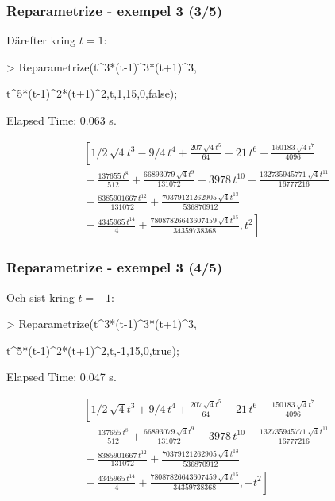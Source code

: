 \documentclass{beamer}
\begin{document}
\begin{frame}
	\frametitle{Reparametrize - exempel 3 (3/5)}
	
	\begin{example}
		Därefter kring $t=1$:
		
		\begin{semiverbatim}
			> Reparametrize(t\^{}3*(t-1)\^{}3*(t+1)\^{}3,
			
			\qquad t\^{}5*(t-1)\^{}2*(t+1)\^{}2,t,1,15,0,false);
			
			
			Elapsed Time: 0.063 s.
		\end{semiverbatim}
		
		\[\begin{array}{l}
		\left[1/2\, \sqrt{4}{t}^{3}-9/4\,{t}^{4}+{\frac {207\, \sqrt{4}{t}^{5}}{64}}-21\,{t}^{6}+{\frac {150183\, \sqrt{4}{t}^{7}}{4096}}\right. \\
		\mbox{}-{\frac {137655\,{t}^{8}}{512}}+{\frac {66893079\, \sqrt{4}{t}^{9}}{131072}}-3978\,{t}^{10}+{\frac {132735945771\, \sqrt{4}{t}^{11}}{16777216}}\\
		\mbox{}-{\frac {8385901667\,{t}^{12}}{131072}}+{\frac {70379121262905\, \sqrt{4}{t}^{13}}{536870912}}\\
		\left.\mbox{}-{\frac {4345965\,{t}^{14}}{4}}+{\frac {78087826643607459\, \sqrt{4}{t}^{15}}{34359738368}},{t}^{2}\right]
		\end{array}\]
	\end{example}
\end{frame}

\begin{frame}
	\frametitle{Reparametrize - exempel 3 (4/5)}
	
	\begin{example}
		Och sist kring $t=-1$:
		
		\begin{semiverbatim}
			> Reparametrize(t\^{}3*(t-1)\^{}3*(t+1)\^{}3,
			
			\qquad t\^{}5*(t-1)\^{}2*(t+1)\^{}2,t,-1,15,0,true);
			
			
			Elapsed Time: 0.047 s.
		\end{semiverbatim}
		
		\[\begin{array}{l}
		\left[1/2\, \sqrt{4}{t}^{3}+9/4\,{t}^{4}+{\frac {207\, \sqrt{4}{t}^{5}}{64}}+21\,{t}^{6}+{\frac {150183\, \sqrt{4}{t}^{7}}{4096}}\right.\\
		\mbox{}+{\frac {137655\,{t}^{8}}{512}}+{\frac {66893079\, \sqrt{4}{t}^{9}}{131072}}+3978\,{t}^{10}+{\frac {132735945771\, \sqrt{4}{t}^{11}}{16777216}}\\
		\mbox{}+{\frac {8385901667\,{t}^{12}}{131072}}+{\frac {70379121262905\, \sqrt{4}{t}^{13}}{536870912}}\\
		\left.\mbox{}+{\frac {4345965\,{t}^{14}}{4}}+{\frac {78087826643607459\, \sqrt{4}{t}^{15}}{34359738368}},-{t}^{2}\right]
		\end{array}\]
	\end{example}
\end{frame}
\end{document}
